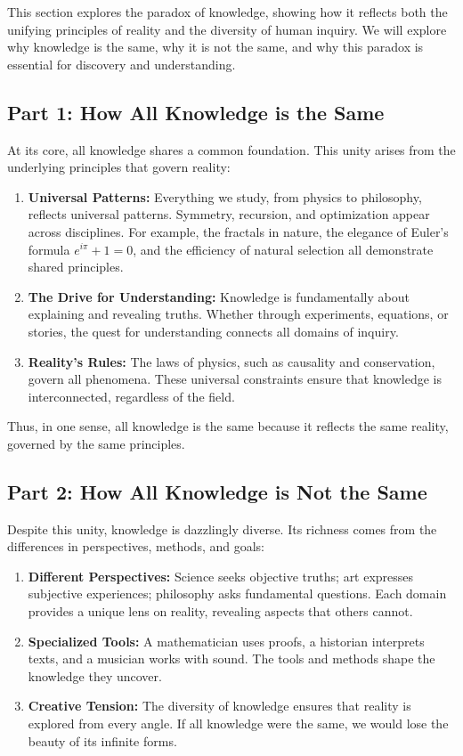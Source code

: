 \documentclass[12pt]{article}
\begin{document}
This section explores the paradox of knowledge, showing how it reflects both the unifying principles of reality and the diversity of human inquiry. We will explore why knowledge is the same, why it is not the same, and why this paradox is essential for discovery and understanding.

\subsection*{Part 1: How All Knowledge is the Same}
At its core, all knowledge shares a common foundation. This unity arises from the underlying principles that govern reality:
\begin{enumerate}
    \item \textbf{Universal Patterns:} Everything we study, from physics to philosophy, reflects universal patterns. Symmetry, recursion, and optimization appear across disciplines. For example, the fractals in nature, the elegance of Euler's formula $e^{i\pi} + 1 = 0$, and the efficiency of natural selection all demonstrate shared principles.
    
    \item \textbf{The Drive for Understanding:} Knowledge is fundamentally about explaining and revealing truths. Whether through experiments, equations, or stories, the quest for understanding connects all domains of inquiry.
    
    \item \textbf{Reality's Rules:} The laws of physics, such as causality and conservation, govern all phenomena. These universal constraints ensure that knowledge is interconnected, regardless of the field.
\end{enumerate}

Thus, in one sense, all knowledge is the same because it reflects the same reality, governed by the same principles.

\subsection*{Part 2: How All Knowledge is Not the Same}
Despite this unity, knowledge is dazzlingly diverse. Its richness comes from the differences in perspectives, methods, and goals:
\begin{enumerate}
    \item \textbf{Different Perspectives:} Science seeks objective truths; art expresses subjective experiences; philosophy asks fundamental questions. Each domain provides a unique lens on reality, revealing aspects that others cannot.
    
    \item \textbf{Specialized Tools:} A mathematician uses proofs, a historian interprets texts, and a musician works with sound. The tools and methods shape the knowledge they uncover.
    
    \item \textbf{Creative Tension:} The diversity of knowledge ensures that reality is explored from every angle. If all knowledge were the same, we would lose the beauty of its infinite forms.
\end{enumerate}
\end{document}
